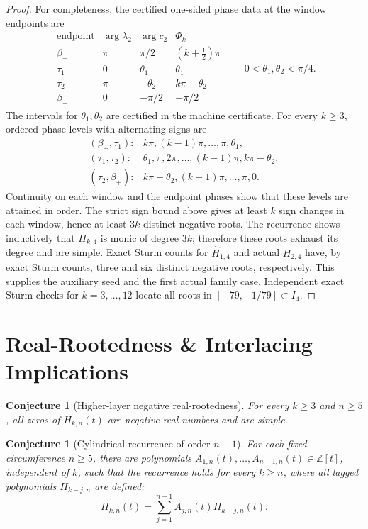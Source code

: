 \documentclass[11pt,a4paper]{article}
\newtheorem{conjecture}[theorem]{Conjecture}
\theoremstyle{definition}
\begin{document}
\begin{proof}
For completeness, the certified one-sided phase data at the window
endpoints are
\[
\begin{array}{c|c|c|c}
\text{endpoint}&\arg\lambda_2&\arg c_2&\Phi_k\\ \hline
\beta_-&\pi&\pi/2&(k+\tfrac12)\pi\\
\tau_1&0&\theta_1&\theta_1\\
\tau_2&\pi&-\theta_2&k\pi-\theta_2\\
\beta_+&0&-\pi/2&-\pi/2
\end{array}
\qquad 0<\theta_1,\theta_2<\pi/4.
\]
The intervals for $\theta_1,\theta_2$ are certified in the machine
certificate. For every $k\ge3$, ordered phase levels with alternating
signs are
\[
\begin{array}{ll}
(\beta_-,\tau_1):&
k\pi,(k-1)\pi,\ldots,\pi,\theta_1,\\
(\tau_1,\tau_2):&
\theta_1,\pi,2\pi,\ldots,(k-1)\pi,k\pi-\theta_2,\\
(\tau_2,\beta_+):&
k\pi-\theta_2,(k-1)\pi,\ldots,\pi,0.
\end{array}
\]
Continuity on each window and the endpoint phases show that these
levels are attained in order. The strict sign bound above gives at
least $k$ sign changes in each window, hence at least $3k$ distinct
negative roots. The recurrence
shows inductively that $H_{k,4}$ is monic of degree $3k$; therefore
these roots exhaust its degree and are simple. Exact Sturm counts for
$\widehat H_{1,4}$ and actual $H_{2,4}$ have, by exact Sturm counts,
three and six distinct negative roots, respectively. This supplies the
auxiliary seed and the first actual family case. Independent exact Sturm
checks for $k=3,\ldots,12$ locate all roots in
$[-79,-1/79]\subset I_4$.
\end{proof}

\section{Real-Rootedness \& Interlacing Implications}
\label{sec:root-implications}

\begin{conjecture}[Higher-layer negative real-rootedness]
\label{conj:realrooted}
For every $k\ge3$ and $n\ge5$, all zeros of $H_{k,n}(t)$ are negative
real numbers and are simple.
\end{conjecture}

\begin{conjecture}[Cylindrical recurrence of order $n-1$]
\label{conj:universal-recurrence}
For each fixed circumference $n\ge5$, there are polynomials
$A_{1,n}(t),\ldots,A_{n-1,n}(t)\in\mathbb{Z}[t]$, independent of $k$,
such that the recurrence holds for every $k\ge n$, where all lagged
polynomials $H_{k-j,n}$ are defined:
\[
H_{k,n}(t)=\sum_{j=1}^{n-1}A_{j,n}(t)H_{k-j,n}(t).
\]
\end{conjecture}
\end{document}
